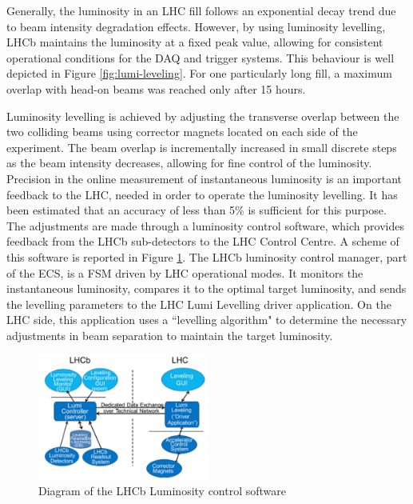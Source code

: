 Generally, the luminosity in an LHC fill follows an exponential decay trend due to beam intensity degradation effects. However, by using luminosity levelling, LHCb maintains the luminosity at a fixed peak value, allowing for consistent operational conditions for the DAQ and trigger systems.  This behaviour is well depicted in Figure \ref{fig:lumi-leveling}. For one particularly long fill, a maximum overlap with head-on beams was reached only after 15 hours. 


Luminosity levelling is achieved by adjusting the transverse overlap between the two colliding beams using corrector magnets located on each side of the experiment. The beam overlap is incrementally increased in small discrete steps as the beam intensity decreases, allowing for fine control of the luminosity. Precision in the online measurement of instantaneous luminosity is an important feedback to the LHC, needed in order to operate the luminosity levelling. It has been estimated that an accuracy of less than 5\% is sufficient for this purpose. 
 The adjustments are made through a luminosity control software, which provides feedback from the LHCb sub-detectors to the LHC Control Centre. A scheme of this software is reported in Figure \ref{fig:lumi-control}.
The LHCb luminosity control manager, part of the ECS, is a FSM driven by LHC operational modes. It monitors the instantaneous luminosity, compares it to the optimal target luminosity, and sends the levelling parameters to the LHC Lumi Levelling driver application. On the LHC side, this application uses a ``levelling algorithm" to determine the necessary adjustments in beam separation to maintain the target luminosity.

\begin{figure}
    \centering
    \includegraphics[width=0.5\textwidth]{figures/lumi_control.png}
    \caption{Diagram of the LHCb Luminosity control software}
    \label{fig:lumi-control}
\end{figure}

